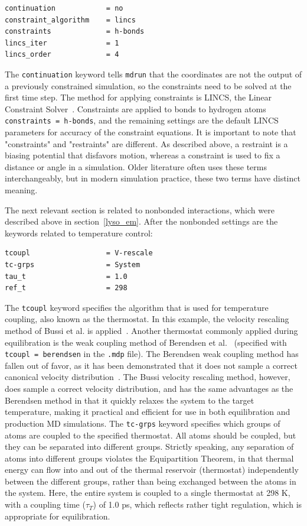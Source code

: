 \documentclass[9pt,tutorial,pubversion]{livecoms}
\begin{document}
\begin{lstlisting}
continuation            = no
constraint_algorithm    = lincs
constraints             = h-bonds
lincs_iter              = 1
lincs_order             = 4
\end{lstlisting}
%
The \texttt{continuation} keyword tells \texttt{mdrun} that the coordinates are not the output of a previously constrained simulation, so the constraints need to be solved at the first time step. The method for applying constraints is LINCS, the Linear Constraint Solver~\cite{Hess1997,Hess2008b}. Constraints are applied to bonds to hydrogen atoms \texttt{constraints = h-bonds}, and the remaining settings are the default LINCS parameters for accuracy of the constraint equations. It is important to note that "constraints" and "restraints" are different. As described above, a restraint is a biasing potential that disfavors motion, whereas a constraint is used to fix a distance or angle in a simulation. Older literature often uses these terms interchangeably, but in modern simulation practice, these two terms have distinct meaning.

The next relevant section is related to nonbonded interactions, which were described above in section~\ref{lyso_em}. After the nonbonded settings are the keywords related to temperature control:

\begin{lstlisting}
tcoupl                  = V-rescale
tc-grps                 = System
tau_t                   = 1.0
ref_t                   = 298
\end{lstlisting}
%
The \texttt{tcoupl} keyword specifies the algorithm that is used for temperature coupling, also known as the thermostat. In this example, the velocity rescaling method of Bussi et al. is applied~\cite{Bussi2007}. Another thermostat commonly applied during equilibration is the weak coupling method of Berendsen et al.~\cite{Berendsen1984} (specified with \texttt{tcoupl = berendsen} in the \texttt{.mdp} file). The Berendsen weak coupling method has fallen out of favor, as it has been demonstrated that it does not sample a correct canonical velocity distribution~\cite{Bussi2007}. The Bussi velocity rescaling method, however, does sample a correct velocity distribution, and has the same advantages as the Berendsen method in that it quickly relaxes the system to the target temperature, making it practical and efficient for use in both equilibration and production MD simulations. The \texttt{tc-grps} keyword specifies which groups of atoms are coupled to the specified thermostat. All atoms should be coupled, but they can be separated into different groups. Strictly speaking, any separation of atoms into different groups violates the Equipartition Theorem, in that thermal energy can flow into and out of the thermal reservoir (thermostat) independently between the different groups, rather than being exchanged between the atoms in the system. Here, the entire system is coupled to a single thermostat at 298 K, with a coupling time ($\tau_{T}$) of 1.0 ps, which reflects rather tight regulation, which is appropriate for equilibration.
\end{document}
